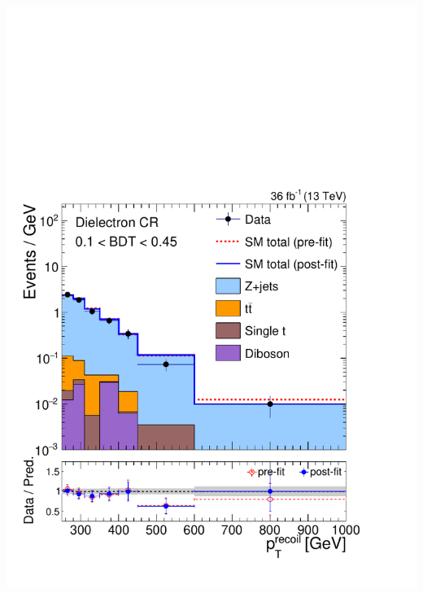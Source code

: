 \documentclass[aspectratio=169,xcolor=dvipsnames,,table,compress]{beamer}
\begin{document}
\begin{frame}[t]
\begin{columns}[T]
\begin{column}{0.125\textwidth}
      \includegraphics[width=\textwidth]{../figures/monotop/postfit/stackedPostfit_dielectron_monotop_loose.pdf}\\

\end{column}
\end{columns}
\end{frame}
\end{document}
